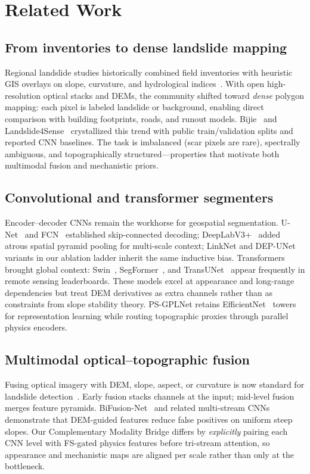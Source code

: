 \section{Related Work}
\subsection{From inventories to dense landslide mapping}
Regional landslide studies historically combined field inventories with heuristic GIS overlays on slope, curvature, and hydrological indices~\cite{pradhan2017landslide,reiche2013landslide}. With open high-resolution optical stacks and DEMs, the community shifted toward \emph{dense} polygon mapping: each pixel is labeled landslide or background, enabling direct comparison with building footprints, roads, and runout models. Bijie~\cite{ji2020bijie} and Landslide4Sense~\cite{ghorbanzadeh2022landslide4sense} crystallized this trend with public train/validation splits and reported CNN baselines. The task is imbalanced (scar pixels are rare), spectrally ambiguous, and topographically structured---properties that motivate both multimodal fusion and mechanistic priors.

\subsection{Convolutional and transformer segmenters}
Encoder--decoder CNNs remain the workhorse for geospatial segmentation. U-Net~\cite{ronneberger2015unet} and FCN~\cite{long2015fcn} established skip-connected decoding; DeepLabV3+~\cite{chen2018deeplab} added atrous spatial pyramid pooling for multi-scale context; LinkNet and DEP-UNet variants in our ablation ladder inherit the same inductive bias. Transformers~\cite{vaswani2017attention,dosovitskiy2021vit} brought global context: Swin~\cite{hu2021swin}, SegFormer~\cite{xie2021segformer}, and TransUNet~\cite{chen2021transunet} appear frequently in remote sensing leaderboards. These models excel at appearance and long-range dependencies but treat DEM derivatives as extra channels rather than as constraints from slope stability theory. PS-GPLNet retains EfficientNet~\cite{tan2019efficientnet} towers for representation learning while routing topographic proxies through parallel physics encoders.

\subsection{Multimodal optical--topographic fusion}
Fusing optical imagery with DEM, slope, aspect, or curvature is now standard for landslide detection~\cite{ghorbanzadeh2019landslide,ji2020bijie,ghorbanzadeh2022landslide4sense}. Early fusion stacks channels at the input; mid-level fusion merges feature pyramids. BiFusion-Net~\cite{mercier2022bifusion} and related multi-stream CNNs demonstrate that DEM-guided features reduce false positives on uniform steep slopes. Our Complementary Modality Bridge differs by \emph{explicitly} pairing each CNN level with FS-gated physics features before tri-stream attention, so appearance and mechanistic maps are aligned per scale rather than only at the bottleneck.

